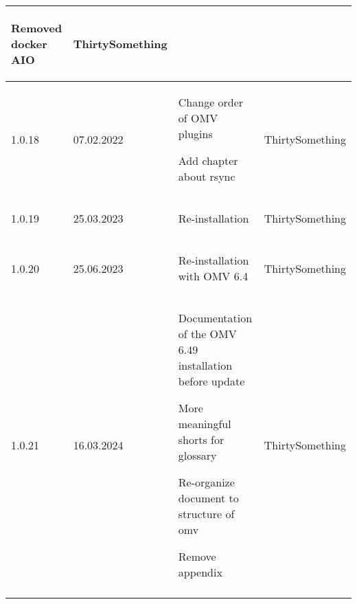 \begin{tiny}
\begin{longtable}{ | p{} | p{} | P{0.49\textwidth} | p{0.15\textwidth} | }
\begin{tsLTItemize}
            \item Removed docker AIO
        \end{tsLTItemize}
                                 &
        ThirtySomething            \\
        \hline
        1.0.18                   &
        07.02.2022               &
        \begin{tsLTItemize}
            \item Change order of OMV plugins
            \item Add chapter about rsync
        \end{tsLTItemize}
                                 &
        ThirtySomething            \\
        \hline
        1.0.19                   &
        25.03.2023               &
        \begin{tsLTItemize}
            \item Re-installation
        \end{tsLTItemize}
                                 &
        ThirtySomething            \\
        \hline
        1.0.20                   &
        25.06.2023               &
        \begin{tsLTItemize}
            \item Re-installation with OMV 6.4
        \end{tsLTItemize}
                                 &
        ThirtySomething            \\
        \hline
        1.0.21                   &
        16.03.2024               &
        \begin{tsLTItemize}
            \item Documentation of the OMV 6.49 installation before update
            \item More meaningful shorts for glossary
            \item Re-organize document to structure of \gls{omv}
            \item Remove appendix
        \end{tsLTItemize}
                                 &
        ThirtySomething            \\
        \hline
    \end{longtable}
\end{tiny}
